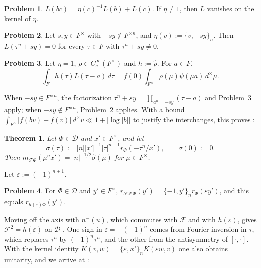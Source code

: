 \documentclass[reqno]{amsart}
\newcommand{\Fc}{\mathcal{F}}
\newcommand{\Dc}{\mathcal{D}}
\numberwithin{equation}{section}
\theoremstyle{definition}
\newtheorem{problem}{Problem}[section]
\theoremstyle{plain}
\newtheorem{theorem}{Theorem}[section]
\begin{document}
\begin{problem}\label{pr:log-cocycle}
  $L(b c) = \eta(c)^{-1} L(b) + L(c)$.  If $\eta \neq 1$, then $L$ vanishes on the kernel of $\eta$.
\end{problem}

\begin{problem}\label{pr:steinberg-line}
  Let $s, y \in F^\times$ with $- s y \notin F^{\times n}$, and $\eta(v) := \{v, - s y\}_n$.  Then $L(\tau^n + s y) = 0$ for every $\tau \in F$ with $\tau^n + s y \neq 0$.
\end{problem}

\begin{problem}\label{pr:linear-factor}
  Let $\eta = 1$, $\rho \in C_c^\infty(F^\times)$ and $h := \hat{\rho}$.  For $a \in F$,
  \begin{equation*}
    \int_F h(\tau) L(\tau - a) \, d \tau = f(0) \int_{F^\times} \rho(\mu) \psi(\mu a) \, d^\times \mu.
  \end{equation*}
\end{problem}

When $- s y \in F^{\times n}$, the factorization $\tau^n + s y = \prod_{a^n = - s y} (\tau - a)$ and Problem~\ref{pr:linear-factor} apply; when $- s y \notin F^{\times n}$, Problem~\ref{pr:steinberg-line} applies.  With a bound $\int_{F^\times} \lvert f(b v) - f(v) \rvert \, d^\times v \ll 1 + \lvert \log \lvert b \rvert \rvert$ to justify the interchanges, this proves \cite[Lemma~A.2]{N}:

\begin{theorem}\label{th:axis-to-marg}
  Let $\Phi \in \Dc$ and $x' \in F^\times$, and let
  \begin{equation*}
    \sigma(\tau) := \lvert n \rvert \lvert x' \rvert^{-1} \lvert \tau \rvert^{n-1} r_\Phi(- \tau^n / x'),
    \qquad
    \sigma(0) := 0.
  \end{equation*}
  Then $m_{\Fc \Phi}(\mu^n x') = \lvert n \rvert^{-1/2} \hat{\sigma}(\mu)$ for $\mu \in F^\times$.
\end{theorem}

Let $\varepsilon := (-1)^{n+1}$.

\begin{problem}\label{pr:inversion-axis}
  For $\Phi \in \Dc$ and $y' \in F^\times$, $r_{\Fc \Fc \Phi}(y') = \{-1, y'\}_n r_\Phi(\varepsilon y')$, and this equals $r_{h(\varepsilon) \Phi}(y')$.
\end{problem}

Moving off the axis with $n^-(u)$, which commutes with $\Fc$ and with $h(\varepsilon)$, gives $\Fc^2 = h(\varepsilon)$ on $\Dc$ \cite[Proposition~A.3]{N}.  One sign in $\varepsilon = -(-1)^n$ comes from Fourier inversion in $\tau$, which replaces $\tau^n$ by $(-1)^n \tau^n$, and the other from the antisymmetry of $[\cdot, \cdot]$.  With the kernel identity $\overline{K(v, w)} = \{\varepsilon, x'\}_n K(\varepsilon w, v)$ one also obtains unitarity, and we arrive at \cite[Theorem~7.1]{N}:
\end{document}
